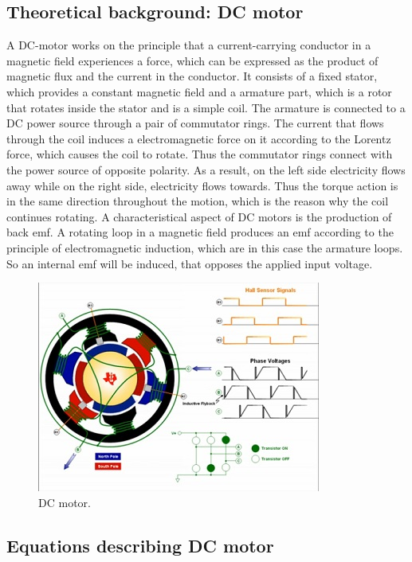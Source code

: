 \subsection{Theoretical background: DC motor}
A DC-motor works on the principle that a current-carrying conductor in a magnetic field experiences a force, which can be expressed as the product of magnetic flux and the current in the conductor. It consists of a fixed stator, which provides a constant magnetic field and a armature part, which is a rotor that rotates inside the stator and is a simple coil. The armature is connected to a DC power source through a pair of commutator rings. The current that flows through the coil induces a electromagnetic force on it according to the Lorentz force, which causes the coil to rotate. Thus the commutator rings connect with the  power source of opposite polarity. As a result, on the left side electricity flows away while on the right side, electricity flows towards. Thus the torque action is in the same direction throughout the motion, which is the reason why the coil continues rotating. 
A characteristical aspect of DC motors is the production of back emf. A rotating loop in a magnetic field produces an emf according to the principle of electromagnetic induction, which are in this case the armature loops. So an internal emf will be induced, that opposes the applied input voltage. 
\begin{figure}[htsb]
  \centering
  \includegraphics{figures/DC-motor.jpg}
  \caption{DC motor.}
\end{figure}




\clearpage


\subsection{Equations describing DC motor}

